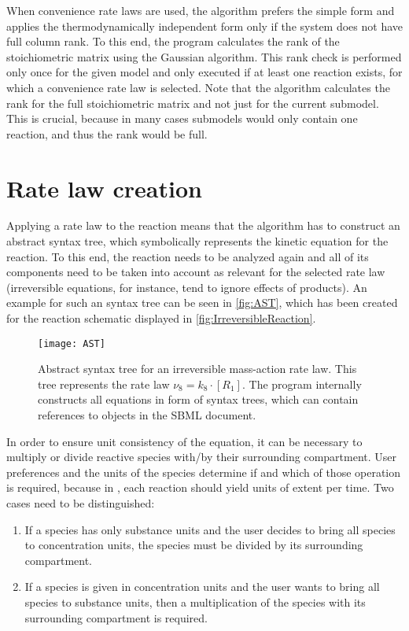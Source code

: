 When convenience rate laws are used, the algorithm prefers the simple form and applies the thermodynamically independent form only if the system does not have full column rank.
To this end, the program calculates the rank of the stoichiometric matrix using the Gaussian algorithm.
This rank check is performed only once for the given model and only executed if at least one reaction exists, for which a convenience rate law is selected.
Note that the algorithm calculates the rank for the full stoichiometric matrix and not just for the current submodel.
This is crucial, because in many cases submodels would only contain one reaction, and thus the rank would be full.

\section{Rate law creation}

Applying a rate law to the reaction means that the algorithm has to construct an abstract syntax tree, which symbolically represents the kinetic equation for the reaction.
To this end, the reaction needs to be analyzed again and all of its components need to be taken into account as relevant for the selected rate law (irreversible equations, for instance, tend to ignore effects of products).
An example for such an syntax tree can be seen in \vref{fig:AST}, which has been created for the reaction schematic displayed in \vref{fig:IrreversibleReaction}.
\begin{SCfigure}
  \texttt{[image: AST]}
  \caption[Abstract syntax tree for an irreversible mass-action rate law]{Abstract syntax tree for an irreversible mass-action rate law. This tree represents the rate law $\nu_8 = k_8\cdot [R_1]$. The program internally constructs all equations in form of syntax trees, which can contain references to objects in the \ac{SBML} document.}
  \label{fig:AST}
\end{SCfigure}

In order to ensure unit consistency of the equation, it can be necessary to multiply or divide reactive species with/by their surrounding compartment.
User preferences and the units of the species determine if and which of those operation is required, because in \SBML, each reaction should yield units of extent per time.
Two cases need to be distinguished:
\begin{enumerate}
  \item If a species has only substance units and the user decides to bring all species to concentration units, the species must be divided by its surrounding compartment.
  \item If a species is given in concentration units and the user wants to bring all species to substance units, then a multiplication of the species with its surrounding compartment is required.
\end{enumerate}

